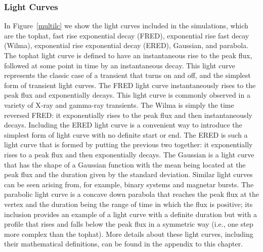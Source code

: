 \documentclass[12pt]{article}
\begin{document}
\subsubsection{Light Curves}
In Figure~\ref{multilc} we show the light curves included in the simulations, which are the tophat, fast rise exponential decay (FRED), exponential rise fast decay (Wilma), exponential rise exponential decay (ERED), Gaussian, and parabola. The tophat light curve is defined to have an instantaneous rise to the peak flux, followed at some point in time by an instantaneous decay. This light curve represents the classic case of a transient that turns on and off, and the simplest form of transient light curves. The FRED light curve instantaneously rises to the peak flux and exponentially decays. This light curve is commonly observed in a variety of X-ray and gamma-ray transients. The Wilma is simply the time reversed FRED: it exponentially rises to the peak flux and then instantaneously decays. Including the ERED light curve is a convenient way to introduce the simplest form of light curve with no definite start or end. The ERED is such a light curve that is formed by putting the previous two together: it exponentially rises to a peak flux and then exponentially decays. The Gaussian is a light curve that has the shape of a Gaussian function with the mean being located at the peak flux and the duration given by the standard deviation. Similar light curves can be seen arising from, for example, binary systems and magnetar bursts.  The parabolic light curve is a concave down parabola that reaches the peak flux at the vertex and the duration being the range of time in which the flux is positive; its inclusion provides an example of a light curve with a definite duration but with a profile that rises and falls below the peak flux in a symmetric way (i.e., one step more complex than the tophat). More details about these light curves, including their mathematical definitions, can be found in the appendix to this chapter.
\end{document}
